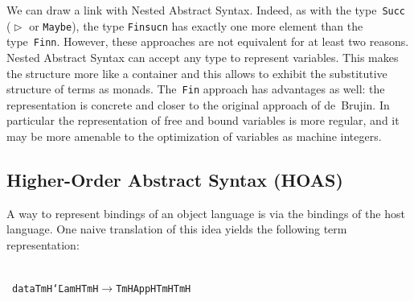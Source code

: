 \documentclass[9pt,authoryear]{sigplanconf}
\begin{document}
%
We can draw a link with Nested Abstract Syntax. Indeed, as with the
    type{~}\texttt{Succ} (\texttt{\makebox[1.22ex][l]{$ {(} $}}\texttt{$ \vartriangleright $}\texttt{\mbox{\hspace{0.50em}}}\texttt{\makebox[1.22ex][l]{$ {(} $}}\texttt{\makebox[1.22ex][r]{$ {)} $}}\texttt{\makebox[1.22ex][r]{$ {)} $}} or \texttt{Maybe}), the type \texttt{Fin}\texttt{\mbox{\hspace{0.50em}}}\texttt{\makebox[1.22ex][l]{$ {(} $}}\texttt{suc}\texttt{\mbox{\hspace{0.50em}}}\texttt{n}\texttt{\makebox[1.22ex][r]{$ {)} $}}    has exactly one more element than the type{~}\texttt{Fin}\texttt{\mbox{\hspace{0.50em}}}\texttt{n}. However, these
    approaches are not equivalent for at least two reasons. Nested
    Abstract Syntax can accept any type to represent variables. This
    makes the structure more like a container and this allows to exhibit
    the substitutive structure of terms as monads. The{~}\texttt{Fin} approach
    has advantages as well{:} the representation is concrete and closer to
    the original approach of de{~}Brujin. In particular the representation
    of free and bound variables is more regular, and it may be more
    amenable to the optimization of variables as machine integers.%


\subsection{Higher-Order Abstract Syntax (HOAS)}

%
A way to represent bindings of an object language is via the
    bindings of the host language. One naive translation of this idea
    yields the following term representation{:}%


{\nopagebreak }

%
%
%
~\\~\vphantom{$\{$}\texttt{data}\texttt{\mbox{\hspace{0.50em}}}\texttt{TmH}\texttt{\mbox{\hspace{0.50em}}}\texttt{{\char `\=}}\texttt{\mbox{\hspace{0.50em}}}\texttt{LamH}\texttt{\mbox{\hspace{0.50em}}}\texttt{\makebox[1.22ex][l]{$ {(} $}}\texttt{TmH}\texttt{\mbox{\hspace{0.50em}}}\texttt{$ \rightarrow $}\texttt{\mbox{\hspace{0.50em}}}\texttt{TmH}\texttt{\makebox[1.22ex][r]{$ {)} $}}\texttt{\mbox{\hspace{0.50em}}}\texttt{\makebox[1.22ex][c]{\textbar{}}}\texttt{\mbox{\hspace{0.50em}}}\texttt{AppH}\texttt{\mbox{\hspace{0.50em}}}\texttt{TmH}\texttt{\mbox{\hspace{0.50em}}}\texttt{TmH}\texttt{{\nopagebreak \newline%
}\vphantom{$\{$}}%
\end{document}
